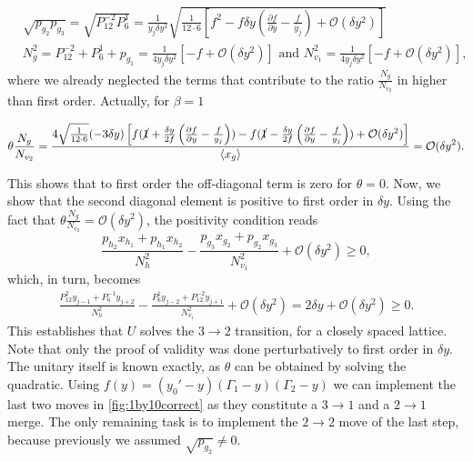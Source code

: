 \documentclass{theoretics}
\begin{document}
\begin{align*}
   & \sqrt{p_{g_{2}}p_{g_{3}}}  =\sqrt{P_{12}^{-2}P_{6}^{1}}=\frac{1}{y_{j}\delta y^{2}}\sqrt{\frac{1}{12\cdot 6}\left[f^{2}-f\delta y\left(\frac{\partial f}{\partial y}-\frac{f}{y_{j}}\right)+\mathcal{O}(\delta y^{2})\right]} \\
   & N_{g}^{2}  =P_{12}^{-2}+P_{6}^{1}+p_{g_{1}} =\frac{1}{4y_{j}\delta y^{2}}\left[-f+\mathcal{O}(\delta y^{2})\right]\text{ and }
  N_{v_{1}}^{2}  =\frac{1}{4y_{j}\delta y^{2}}\left[-f+\mathcal{O}(\delta y^{2})\right],
\end{align*}where we already neglected the terms that contribute to the ratio $\frac{N_{g}}{N_{v_{2}}}$ in higher than first order.
Actually, for $\beta=1$
\begin{small}
  \begin{equation*}
    \theta\frac{N_{g}}{N_{v_{2}}}  =\frac{4\sqrt{\frac{1}{12\cdot 6}}(-3\delta y)\left[f (\cancel{1}+\frac{\delta y}{2f}\left(\frac{\partial f}{\partial y}-\frac{f}{y_{j}}\right))-f(\cancel{1}-\frac{\delta y}{2f}\left(\frac{\partial f}{\partial y}-\frac{f}{y_{j}}\right))+\mathcal{O}(\delta y^{2})\right]}{\langle x_{g}\rangle }=\mathcal{O}(\delta y^{2}).
  \end{equation*}
\end{small}This shows that to first order the off-diagonal term is zero for $\theta=0$. Now, we show that the second diagonal element is positive to first
order in $\delta y$. Using the fact that $\theta\frac{N_{g}}{N_{v_{2}}}=\mathcal{O}(\delta y^{2})$,
the positivity condition reads
\begin{displaymath}
  \frac{p_{h_{2}}x_{h_{1}}+p_{h_{1}}x_{h_{2}}}{N_{h}^{2}}-\frac{p_{g_{3}}x_{g_{2}}+p_{g_{2}}x_{g_{3}}}{N_{v_{1}}^{2}}+\mathcal{O}(\delta y^{2})\ge0,
\end{displaymath}
which, in turn, becomes
\begin{align*}
  \frac{P_{12}^{2}y_{j-1}+P_{6}^{-1}y_{j+2}}{N_{h}^{2}}-\frac{P_{6}^{1}y_{j-2}+P_{12}^{-2}y_{j+1}}{N_{v_{1}}^{2}}+\mathcal{O}(\delta y^{2})
  =2\delta y+\mathcal{O}(\delta y^{2})\ge0.
\end{align*}
This establishes that $U$ solves the $3\to 2$ transition, for a closely spaced lattice.
%
Note that only the proof of validity was done perturbatively to first
order in $\delta y$. The unitary itself is known exactly, as $\theta$
can be obtained by solving the quadratic. Using $f(y)=(y_{0}'-y)(\Gamma_{1}-y)(\Gamma_{2}-y)$ we can implement
the last two moves in  \cref{fig:1by10correct} as they constitute a $3\to1$
and a $2\to1$ merge. The only
remaining task is to implement the $2\to2$ move of the last step,
because previously we assumed $\sqrt{p_{g_{2}}}\neq0$.
\end{document}

